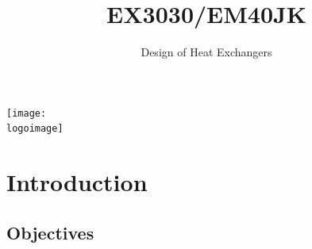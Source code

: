 \documentclass[10pt,compress,unknownkeysallowed]{beamer}
\institute{School of Engineering}
\title{EX3030/EM40JK}
\subtitle{Design of Heat Exchangers}
\date[ ]{ }
\newcommand{\logoimage}{../FigBanner/UoAHorizBanner}
\begin{document}
\begin{frame}
  \titlepage
  \vfill%
  \begin{center}
    \texttt{[image: \\logoimage]}
  \end{center}
\end{frame}




\section{Introduction} 


\subsection{Objectives}
\end{document}
